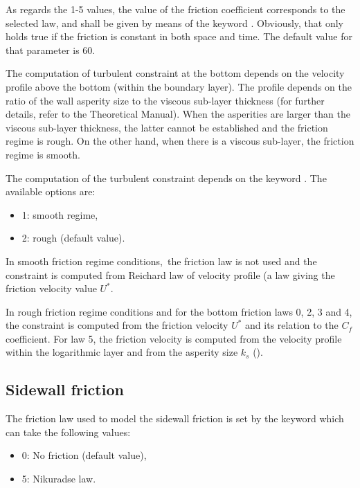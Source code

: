 As regards the 1-5 values, the value of the friction coefficient corresponds to
the selected law, and shall be given by means of the keyword . Obviously, that only holds true if the friction is
constant in both space and time. The default value for that parameter is 60.

The computation of turbulent constraint at the bottom depends on the velocity
profile above the bottom (within the boundary layer). The profile depends on
the ratio of the wall asperity size to the viscous sub-layer thickness (for
further details, refer to the Theoretical Manual). When the asperities are
larger than the viscous sub-layer thickness, the latter cannot be established
and the friction regime is rough. On the other hand, when there is a viscous
sub-layer, the friction regime is smooth.

The computation of the turbulent constraint depends on the keyword
. The available options are:

\begin{itemize}
\item  1: smooth regime,

\item  2: rough (default value).
\end{itemize}

In smooth friction regime conditions,~the friction law is not used and the
constraint is computed from Reichard law of velocity profile (a law giving the
friction velocity value $U^{*}$.

In rough friction regime conditions and for the bottom friction laws 0, 2, 3
and 4, the constraint is computed from the friction velocity $U^{*}$ and its
relation to the $C_{f}$ coefficient. For law 5, the friction velocity is
computed from the velocity profile within the logarithmic layer and from the
asperity size $k_{s}$ ().


\subsection{Sidewall friction}

The friction law used to model the sidewall friction is set by the keyword
 which can take the following
values:

\begin{itemize}
\item  0: No friction (default value),

\item  5: Nikuradse law.
\end{itemize}

